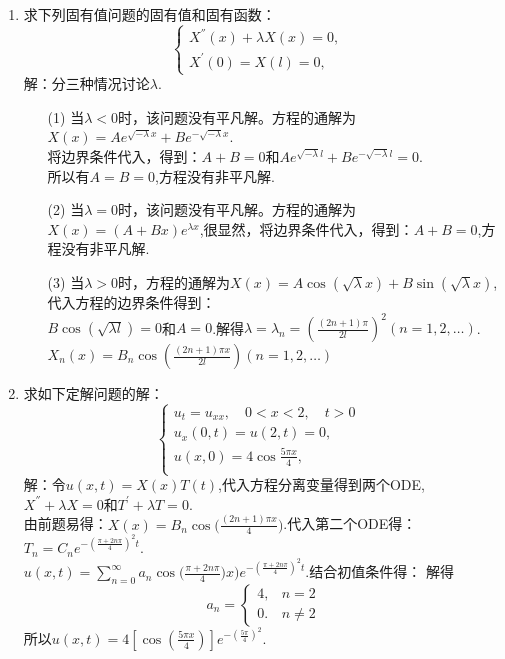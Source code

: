 \documentclass[11pt]{article}
\begin{document}
\begin{enumerate}
        \item 求下列固有值问题的固有值和固有函数：
    \begin{equation*}
            \left\{
             \begin{array}{lr}
             X^{''}(x)+\lambda X(x)=0, &  \\
             X^{'}(0)=X(l)=0, &
             \end{array}
            \right.
            \end{equation*}
    解：分三种情况讨论$\lambda$.
    \begin{enumerate}
        \item[(1)] 当$\lambda <0$时，该问题没有平凡解。方程的通解为$X(x)=Ae^{\sqrt {-\lambda }x}+Be^{-\sqrt {-\lambda }x}$.\\将边界条件代入，得到：$A+B=0$和$Ae^{\sqrt {-\lambda }l}+Be^{-\sqrt {-\lambda }l}=0$.\\所以有$A=B=0$,方程没有非平凡解.
        \item[(2)] 当$\lambda =0$时，该问题没有平凡解。方程的通解为$X(x)=(A+Bx)e^{\lambda x}$,很显然，将边界条件代入，得到：$A+B=0$,方程没有非平凡解.
        \item[(3)] 当$\lambda >0$时，方程的通解为$X(x)=A\cos(\sqrt {\lambda }x)+B\sin(\sqrt {\lambda }x)$,代入方程的边界条件得到：\\ $B\cos(\sqrt {\lambda l})=0$和$A=0$.解得$\lambda =\lambda_n=(\frac{(2n+1)\pi}{2l})^2(n=1,2,\dots)$.$X_n(x)=B_{n}\cos(\frac{(2n+1)\pi x}{2l})(n=1,2,\dots)$

    \end{enumerate}

        \item 求如下定解问题的解：
    \begin{equation*}
            \left\{
             \begin{array}{lr}
             u_{t}=u_{xx},\quad 0<x<2,\quad t>0 &  \\
             u_x(0,t)=u(2,t)=0, & \\
             u(x,0)=4\cos\frac{5\pi x}{4}, &    \\
             \end{array}
            \right.
            \end{equation*}
        解：令$u(x,t)=X(x)T(t)$,代入方程分离变量得到两个ODE,$X^{''}+\lambda X=0$和$T^{'}+\lambda T=0$.\\由前题易得：$X(x)=B_n\cos\big(\frac{(2n+1)\pi x}{4}\big)$.代入第二个ODE得：$T_n=C_{n}e^{-(\frac{\pi+2n\pi}{4})^2 t}$.\\ $u(x,t)=\sum_{n=0}^{\infty}a_n\cos\big(\frac{\pi+2n\pi}{4})x\big)e^{-(\frac{\pi+2n\pi}{4})^2 t}$.结合初值条件得：
        解得\begin{equation*}
            a_n=\begin{cases}
                    4,& n=2\\
                    0.&n\neq 2
            \end{cases}
            \end{equation*}
        所以$u(x,t)=4[\cos(\frac{5\pi x}{4})]e^{-(\frac{5\pi}{4})^2}$.

    \end{enumerate}
\end{document}

